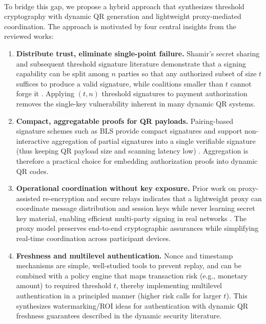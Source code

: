 \documentclass[a4paper]{scl-article}
\begin{document}
\paragraph{}To bridge this gap, we propose a hybrid approach that synthesizes threshold cryptography with dynamic QR generation and lightweight proxy‑mediated coordination. The approach is motivated by four central insights from the reviewed works:


\begin{enumerate}
    \item \textbf{Distribute trust, eliminate single-point failure.} Shamir’s secret sharing and subsequent threshold signature literature demonstrate that a signing capability can be split among $n$ parties so that any authorized subset of size $t$ suffices to produce a valid signature, while coalitions smaller than $t$ cannot forge it \cite{shamir1979, desmedt1988, gennaro2007}. Applying $(t,n)$ threshold signatures to payment authorization removes the single-key vulnerability inherent in many dynamic QR systems.
    
    \item \textbf{Compact, aggregatable proofs for QR payloads.} Pairing-based signature schemes such as BLS provide compact signatures and support non-interactive aggregation of partial signatures into a single verifiable signature (thus keeping QR payload size and scanning latency low) \cite{boneh2001}. Aggregation is therefore a practical choice for embedding authorization proofs into dynamic QR codes.
    
    \item \textbf{Operational coordination without key exposure.} Prior work on proxy-assisted re-encryption and secure relays indicates that a lightweight proxy can coordinate message distribution and session keys while never learning secret key material, enabling efficient multi-party signing in real networks \cite{chen2011, ruffing2014}. The proxy model preserves end-to-end cryptographic assurances while simplifying real-time coordination across participant devices.
    
    \item \textbf{Freshness and multilevel authentication.} Nonce and timestamp mechanisms are simple, well-studied tools to prevent replay, and can be combined with a policy engine that maps transaction risk (e.g., monetary amount) to required threshold $t$, thereby implementing multilevel authentication in a principled manner (higher risk calls for larger $t$). This synthesizes watermarking/ROI ideas for authentication with dynamic QR freshness guarantees described in the dynamic security literature.
\end{enumerate}
\end{document}

